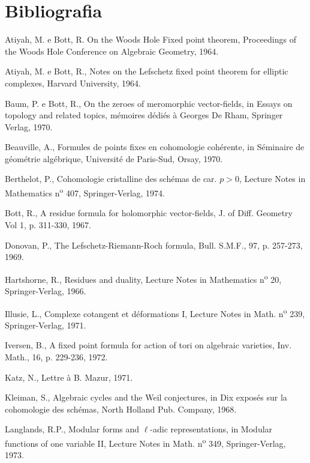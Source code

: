 \section*{Bibliografia}
\begin{enumerate}[label={[\arabic*]},leftmargin=3.5em]
\item Atiyah, M. e Bott, R. On the Woods Hole Fixed point theorem, Proceedings of the Woods Hole Conference on Algebraic Geometry, 1964.
\item Atiyah, M. e Bott, R., Notes on the Lefschetz fixed point theorem for elliptic complexes, Harvard University, 1964.
\item Baum, P. e Bott, R., On the zeroes of meromorphic vector-fields, in Essays on topology and related topics, mémoires dédiés à Georges De Rham, Springer Verlag, 1970.
\item Beauville, A., Formules de points fixes en cohomologie cohérente, in Séminaire de géométrie algébrique, Université de Paris-Sud, Orsay, 1970.
\item Berthelot, P., Cohomologie cristalline des schémas de car. $p>0$, Lecture Notes in Mathematics n\textsuperscript{o} 407, Springer-Verlag, 1974.
\item Bott, R., A residue formula for holomorphic vector-fields, J. of Diff. Geometry Vol 1, p. 311-330, 1967.
\item Donovan, P., The Lefschetz-Riemann-Roch formula, Bull. S.M.F., 97, p. 257-273, 1969.
\item Hartshorne, R., Residues and duality, Lecture Notes in Mathematics n\textsuperscript{o} 20, Springer-Verlag, 1966.
\item Illusie, L., Complexe cotangent et déformations I, Lecture Notes in Math. n\textsuperscript{o} 239, Springer-Verlag, 1971.
\item Iversen, B., A fixed point formula for action of tori on algebraic varieties, Inv. Math., 16, p. 229-236, 1972.
\item Katz, N., Lettre à B. Mazur, 1971.
\item Kleiman, S., Algebraic cycles and the Weil conjectures, in Dix exposés sur la cohomologie des schémas, North Holland Pub. Company, 1968.
\item Langlands, R.P., Modular forms and $\ell$-adic representations, in Modular functions of one variable II, Lecture Notes in Math. n\textsuperscript{o} 349, Springer-Verlag, 1973.

\end{enumerate}
